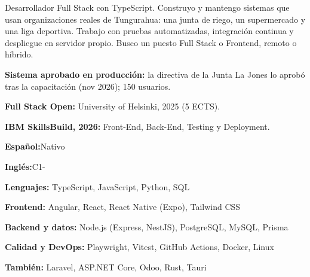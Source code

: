 \documentclass[9pt]{extarticle}
\begin{document}
\fondo
\noindent
\begin{minipage}[t]{\anchoTextoLateral}
\vspace{0pt}
\vspace{14pt}
\color{white}\small\raggedright
{}

Desarrollador Full Stack con TypeScript. Construyo y mantengo sistemas que usan organizaciones reales de Tungurahua: una junta de riego, un supermercado y una liga deportiva. Trabajo con pruebas automatizadas, integración continua y despliegue en servidor propio. Busco un puesto Full Stack o Frontend, remoto o híbrido.

\begin{vinetasLateral}
  \item \textbf{Sistema aprobado en producción:} la directiva de la Junta La Jones lo aprobó tras la capacitación (nov 2026); 150 usuarios.
  \item \textbf{Full Stack Open:} University of Helsinki, 2025 (5 ECTS).
  \item \textbf{IBM SkillsBuild, 2026:} Front-End, Back-End, Testing y Deployment.
\end{vinetasLateral}

\textbf{Español:}\hfill Nativo\par\vspace{2pt}
\vspace{4pt}
\textbf{Inglés:}\hfill C1-\par\vspace{2pt}
\vspace{1pt}{\footnotesize Suficiencia en inglés, UTA, 2024}\par

\textbf{Lenguajes:} TypeScript, JavaScript, Python, SQL\par\vspace{3pt}
\textbf{Frontend:} Angular, React, React Native (Expo), Tailwind CSS\par\vspace{3pt}
\textbf{Backend y datos:} Node.js (Express, NestJS), PostgreSQL, MySQL, Prisma\par\vspace{3pt}
\textbf{Calidad y DevOps:} Playwright, Vitest, GitHub Actions, Docker, Linux\par\vspace{3pt}
\textbf{También:} Laravel, ASP.NET Core, Odoo, Rust, Tauri\par
\end{minipage}%
\end{document}
